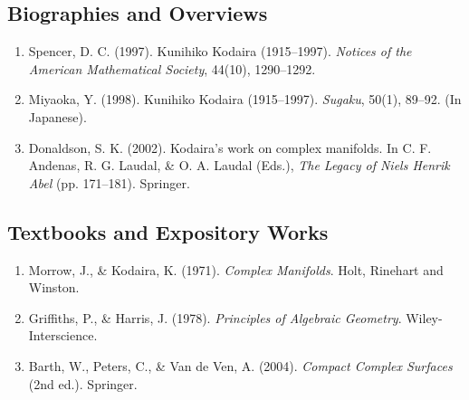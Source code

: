 \subsection*{Biographies and Overviews}
\begin{enumerate}
    \item Spencer, D. C. (1997). Kunihiko Kodaira (1915--1997). \textit{Notices of the American Mathematical Society}, 44(10), 1290--1292.
    \item Miyaoka, Y. (1998). Kunihiko Kodaira (1915--1997). \textit{Sugaku}, 50(1), 89--92. (In Japanese).
    \item Donaldson, S. K. (2002). Kodaira's work on complex manifolds. In C. F. Andenas, R. G. Laudal, \& O. A. Laudal (Eds.), \textit{The Legacy of Niels Henrik Abel} (pp. 171--181). Springer.
\end{enumerate}

\subsection*{Textbooks and Expository Works}
\begin{enumerate}
    \item Morrow, J., \& Kodaira, K. (1971). \textit{Complex Manifolds}. Holt, Rinehart and Winston.
    \item Griffiths, P., \& Harris, J. (1978). \textit{Principles of Algebraic Geometry}. Wiley-Interscience.
    \item Barth, W., Peters, C., \& Van de Ven, A. (2004). \textit{Compact Complex Surfaces} (2nd ed.). Springer.
\end{enumerate}
